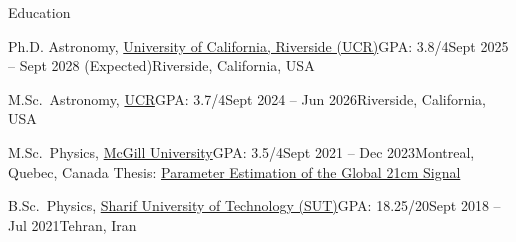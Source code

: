\documentclass[]{kyvernitis-resume}
\begin{document}
\medskip
\begin{section}{Education}
    \begin{subsectionnobullet}{Ph.D. Astronomy, \href{https://www.ucr.edu}{University of California, Riverside (UCR)}}{GPA: 3.8/4}{Sept 2025 -- Sept 2028 (Expected)}{Riverside, California, USA}
    \end{subsectionnobullet}

    \begin{subsectionnobullet}{M.Sc.\ Astronomy, \href{https://www.ucr.edu}{UCR}}{GPA: 3.7/4}{Sept 2024 -- Jun 2026}{Riverside, California, USA}
    \end{subsectionnobullet}
    
    \begin{subsectionnobullet}{M.Sc.\ Physics, \href{https://www.physics.mcgill.ca/}{McGill University}}{GPA: 3.5/4}{Sept 2021 -- Dec 2023}{Montreal, Quebec, Canada}
        Thesis: \href{https://www.proquest.com/openview/e3346eb2737e36a5837fe4141e6ad92a/1?pq-origsite=gscholar\&cbl=18750\&diss=y}{Parameter Estimation of the Global 21cm Signal}
    \end{subsectionnobullet}
    
    \begin{subsectionnobullet}{B.Sc.\ Physics, \href{http://physics.sharif.ir/~phyweb/}{Sharif University of Technology (SUT)}}{GPA: 18.25/20}{Sept 2018 -- Jul 2021}{Tehran, Iran}
    \end{subsectionnobullet}
\end{section}
\end{document}
